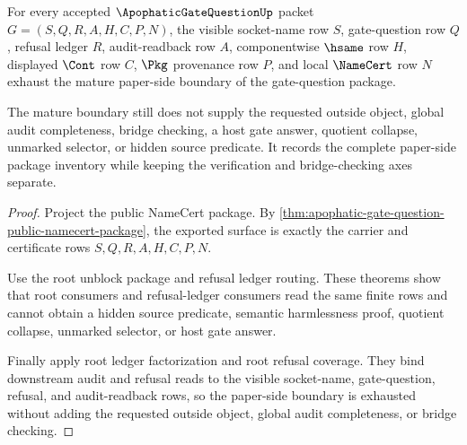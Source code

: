 

\begin{theorem}
\label{thm:apophatic-gate-question-mature-boundary}
For every accepted $\ApophaticGateQuestionUp$ packet $G=(S,Q,R,A,H,C,P,N)$, the visible socket-name row $S$, gate-question row $Q$, refusal ledger $R$, audit-readback row $A$, componentwise $\hsame$ row $H$, displayed $\Cont$ row $C$, $\Pkg$ provenance row $P$, and local $\NameCert$ row $N$ exhaust the mature paper-side boundary of the gate-question package.

The mature boundary still does not supply the requested outside object, global audit completeness, bridge checking, a host gate answer, quotient collapse, unmarked selector, or hidden source predicate. It records the complete paper-side package inventory while keeping the verification and bridge-checking axes separate.
\end{theorem}
\begin{proof}
Project the public NameCert package. By \autoref{thm:apophatic-gate-question-public-namecert-package}, the exported surface is exactly the carrier and certificate rows $S,Q,R,A,H,C,P,N$.

Use the root unblock package and refusal ledger routing. These theorems show that root consumers and refusal-ledger consumers read the same finite rows and cannot obtain a hidden source predicate, semantic harmlessness proof, quotient collapse, unmarked selector, or host gate answer.

Finally apply root ledger factorization and root refusal coverage. They bind downstream audit and refusal reads to the visible socket-name, gate-question, refusal, and audit-readback rows, so the paper-side boundary is exhausted without adding the requested outside object, global audit completeness, or bridge checking.
\end{proof}

